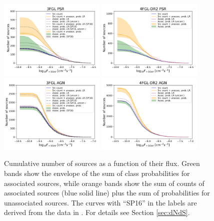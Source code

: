 \begin{figure}[h]
\center
\includegraphics[width=0.45\textwidth]{plots/N_logS_3FGL_PSR_SazP_add_os.pdf}
\includegraphics[width=0.45\textwidth]{plots/N_logS_4FGL-DR2_PSR_add_os.pdf} \\
\includegraphics[width=0.45\textwidth]{plots/N_logS_3FGL_AGN_SazP_add_os.pdf}
\includegraphics[width=0.45\textwidth]{plots/N_logS_4FGL-DR2_AGN_add_os.pdf}
\caption{Cumulative number of sources as a function of their flux. Green bands show the envelope of the sum of class probabilities for associated sources, while orange bands show the sum of counts of associated sources (blue solid line) plus the sum of probabilities for unassociated sources. The curves with ``SP16'' in the labels are derived from the data in \cite{2016ApJ...820....8S}. For details see Section \ref{sec:dNdS}.}  
\label{fig:logN_logS}
\end{figure}


